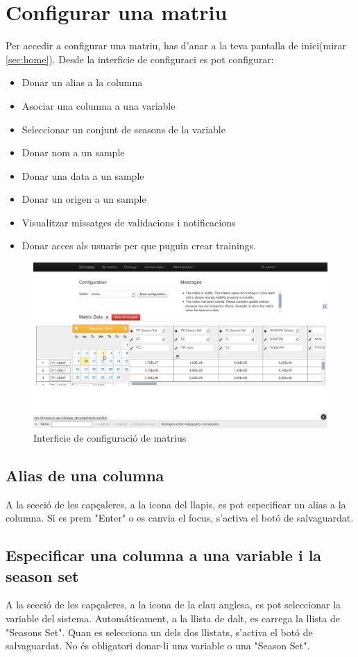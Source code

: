 \section{Configurar una matriu}
\label{sec:configure_matrix}
Per accedir a configurar una matriu, has d'anar a la teva pantalla de inici(mirar \ref{sec:home}). 
Desde la interficie de configuraci es pot configurar:
\begin{itemize}
\item Donar un alias a la columna
\item Asociar una columna a una variable
\item Seleccionar un conjunt de seasons de la variable
\item Donar nom a un sample
\item Donar una data a un sample
\item Donar un origen a un sample
\item Visualitzar missatges de validacions i notificacions
\item Donar acces als usuaris per que puguin crear trainings.
\end{itemize}
\begin{figure}[h!]
  \centering
  \includegraphics[scale=0.2]{img/userguide/matrix_configure.png}
  \caption{Interficie de configuraci\'{o} de matrius}
  \label{fig:configure_matrix}
\end{figure}

\subsection{Alias de una columna} 
A la secci\'{o} de les capçaleres, a la icona del llapis, es pot especificar un alias a la columna. Si es prem "Enter" o es canvia el focus, s'activa el bot\'{o} de salvaguardat.
\subsection{Especificar una columna a una variable i la season set}
A la secci\'{o} de les capçaleres, a la icona de la clau anglesa, es pot seleccionar la variable del sistema. Autom\'{a}ticament, a la llista de dalt, es carrega la llista de "Seasons Set". Quan es selecciona un dels dos llistats, s'activa el bot\'{o} de salvaguardat. No \'{e}s obligatori donar-li una variable o una "Season Set".
